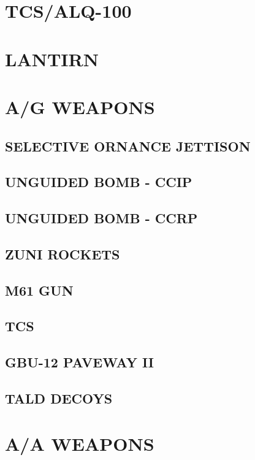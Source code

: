 \documentclass[8pt,usenames,dvipsnames,twoside]{article}
\begin{document}
		\cleardoublepage
		
		\section{TCS/ALQ-100}
		
		\cleardoublepage
		
		\section{LANTIRN}
		
		\cleardoublepage
		
		\section{A/G WEAPONS}
		
		\subsection{SELECTIVE ORNANCE JETTISON}
		\subsection{UNGUIDED BOMB - CCIP}
		\subsection{UNGUIDED BOMB - CCRP}
		\subsection{ZUNI ROCKETS}
		\subsection{M61 GUN}
		\subsection{TCS}
		\subsection{GBU-12 PAVEWAY II}
		\subsection{TALD DECOYS}
		
		\cleardoublepage
		
		\section{A/A WEAPONS}
		
\end{document}
